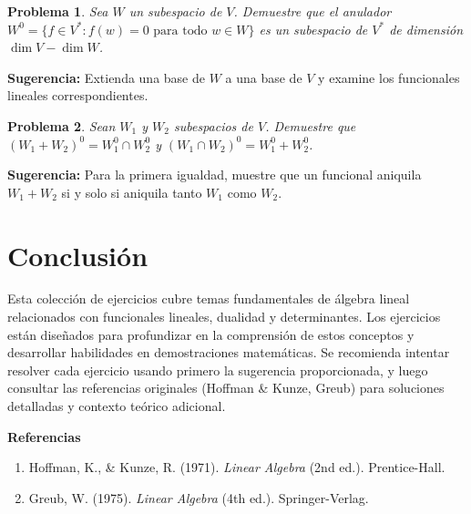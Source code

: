 \documentclass[12pt,a4paper]{article}
\newtheorem{problem}{Problema}
\newenvironment{suggestion}{\par\noindent\textbf{Sugerencia: }}{}
\begin{document}
\begin{problem}
Sea $W$ un subespacio de $V$. Demuestre que el anulador $W^0=\{f\in V^*: f(w)=0 \text{ para todo } w\in W\}$ es un subespacio de $V^*$ de dimensión $\dim V - \dim W$.
\end{problem}
\begin{suggestion}
Extienda una base de $W$ a una base de $V$ y examine los funcionales lineales correspondientes.
\end{suggestion}

\begin{problem}
Sean $W_1$ y $W_2$ subespacios de $V$. Demuestre que $(W_1+W_2)^0 = W_1^0 \cap W_2^0$ y $(W_1\cap W_2)^0 = W_1^0 + W_2^0$.
\end{problem}
\begin{suggestion}
Para la primera igualdad, muestre que un funcional aniquila $W_1+W_2$ si y solo si aniquila tanto $W_1$ como $W_2$.
\end{suggestion}

\section*{Conclusión}

Esta colección de ejercicios cubre temas fundamentales de álgebra lineal relacionados con funcionales lineales, dualidad y determinantes. Los ejercicios están diseñados para profundizar en la comprensión de estos conceptos y desarrollar habilidades en demostraciones matemáticas. Se recomienda intentar resolver cada ejercicio usando primero la sugerencia proporcionada, y luego consultar las referencias originales (Hoffman \& Kunze, Greub) para soluciones detalladas y contexto teórico adicional.

\vspace{0.5cm}
\noindent\textbf{Referencias}
\begin{enumerate}
\item Hoffman, K., \& Kunze, R. (1971). \emph{Linear Algebra} (2nd ed.). Prentice-Hall.
\item Greub, W. (1975). \emph{Linear Algebra} (4th ed.). Springer-Verlag.
\end{enumerate}
\end{document}

